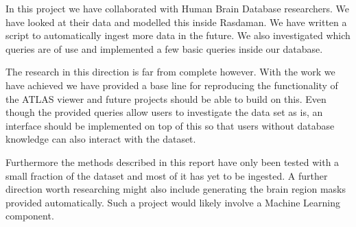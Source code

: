 \label{sec:outlook_conclusion}

In this project we have collaborated with Human Brain Database researchers. We have looked at their data and modelled this inside Rasdaman. We have written a script to automatically ingest more data in the future. We also investigated which queries are of use and implemented a few basic queries inside our database.

The research in this direction is far from complete however. With the work we have achieved we have provided a base line for reproducing the functionality of the ATLAS viewer and future projects should be able to build on this. Even though the provided queries allow users to investigate the data set as is, an interface should be implemented on top of this so that users without database knowledge can also interact with the dataset.

Furthermore the methods described in this report have only been tested with a small fraction of the dataset and most of it has yet to be ingested. A further direction worth researching might also include generating the brain region masks provided automatically. Such a project would likely involve a Machine Learning component.
